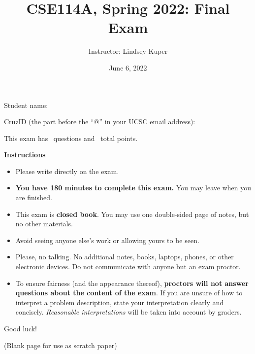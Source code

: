 \documentclass[addpoints]{exam}
\title{CSE114A, Spring 2022: Final Exam}
\author{Instructor: Lindsey Kuper}
\date{June 6, 2022}
\begin{document}
\maketitle

\begin{coverpages}

\bigskip  

\noindent Student name: \hrulefill

\bigskip
\bigskip

\noindent CruzID (the part before the ``@'' in your UCSC email address): \hrulefill

\bigskip
\bigskip

\noindent This exam has \numquestions~questions and \numpoints~total points.

\bigskip
\bigskip

\noindent \textbf{Instructions}

\begin{itemize}
\item Please write directly on the exam.
\item \textbf{You have 180 minutes to complete this exam.} You may leave when you are finished.
\item This exam is \textbf{closed book}.  You may use one double-sided page of notes, but no other materials.
\item Avoid seeing anyone else's work or allowing yours to be seen.
\item Please, no talking.  No additional notes, books, laptops, phones, or other electronic devices. Do not communicate with anyone but an exam proctor.
\item To ensure fairness (and the appearance thereof),
  \textbf{proctors will not answer questions about the content of the exam}. If you are unsure 
  of how to interpret a problem description, state your interpretation clearly and concisely. 
  \textit{Reasonable interpretations} will be taken into account by graders.
\end{itemize}
  
\bigskip

\noindent Good luck!

\newpage

(Blank page for use as scratch paper)

\newpage  

\end{coverpages}
\end{document}

